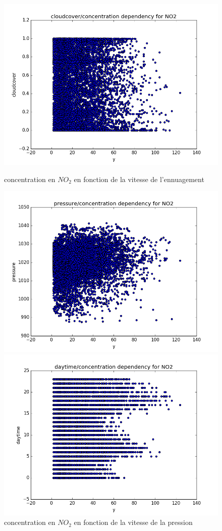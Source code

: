 \begin{figure}[H]
	\captionsetup{labelformat=empty}
	\includegraphics[width=\linewidth]{images/NO2_cloud_y.png}
  \caption{concentration en $NO_2$ en fonction de la vitesse de l'ennuagement}
	\endminipage\hfill
	\includegraphics[width=\linewidth]{images/NO2_pressure_y.png}
  \caption{concentration en $NO_2$ en fonction de la vitesse de la pression}
	\endminipage\hfill
	\includegraphics[width=\linewidth]{images/NO2_daytime_y.png}

\end{figure}
